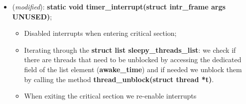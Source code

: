 \documentclass[11pt]{scrartcl}
\begin{document}
\begin{itemize}
    
    \item (\textit{modified}): \textbf{static void timer\_interrupt(struct intr\_frame \*args UNUSED)};
    \begin{itemize}
    \item Disabled interrupts when entering critical section;
    \item Iterating through the \textbf{struct list sleepy\_threads\_list}:
    we check if there are threads that need to be unblocked by accessing the dedicated field of the list element (\textbf{awake\_time}) and if needed we unblock them by calling the method \textbf{thread\_unblock(struct thread *t)}.
    \item When exiting the critical section we re-enable interrupts
    \end{itemize}
    
\end{itemize}
\end{document}
